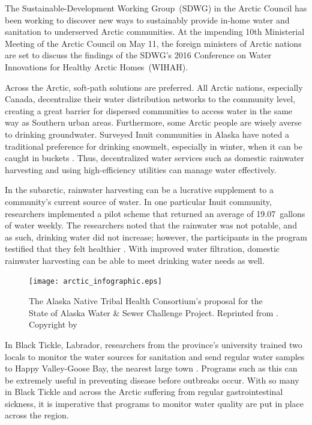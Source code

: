 \documentclass[american]{../../../coursework}
\begin{document}
The Sustainable-Development Working Group~(SDWG) in the Arctic Council has
been working to discover new ways to sustainably provide in-home water and
sanitation to underserved Arctic communities. At the impending 10th
Ministerial Meeting of the Arctic Council on May 11, the foreign ministers of
Arctic nations are set to discuss the findings of the SDWG's 2016 Conference
on Water Innovations for Healthy Arctic Homes~(WIHAH).

Across the Arctic, soft-path solutions are preferred. All Arctic nations,
especially Canada, decentralize their water distribution networks to the
community level, creating a great barrier for dispersed communities to access
water in the same way as Southern urban areas. Furthermore, some Arctic people
are wisely averse to drinking groundwater. Surveyed Inuit communities in
Alaska have noted a traditional preference for drinking snowmelt, especially
in winter, when it can be caught in buckets \parencite{Dotson2016}. Thus,
decentralized water services such as domestic rainwater harvesting and using
high-efficiency utilities can manage water effectively.

In the subarctic, rainwater harvesting can be a lucrative supplement to a
community's current source of water. In one particular Inuit community,
researchers implemented a pilot scheme that returned an average of
19.07~gallons of water weekly. The researchers noted that the rainwater was
not potable, and as such, drinking water did not increase; however, the
participants in the program testified that they felt healthier
\parencite{Mercer2017}. With improved water filtration, domestic rainwater
harvesting can be able to meet drinking water needs as well.

\begin{figure}
    \begin{center}
        \texttt{[image: arctic\_infographic.eps]}
    \end{center}
    \caption{The Alaska Native Tribal Health Consortium's proposal for the
    State of Alaska Water \& Sewer Challenge Project. Reprinted from
    . Copyright \citeyear{PASS} by \citeauthor{PASS}}%
    \label{fig:infographic}
\end{figure}

In Black Tickle, Labrador, researchers from the province's university trained
two locals to monitor the water sources for sanitation and send regular water
samples to Happy Valley-Goose Bay, the nearest large town
\parencite{Hanrahan2014}. Programs such as this can be extremely useful in
preventing disease before outbreaks occur. With so many in Black Tickle and
across the Arctic suffering from regular gastrointestinal sickness, it is
imperative that programs to monitor water quality are put in place across the
region.
\end{document}

